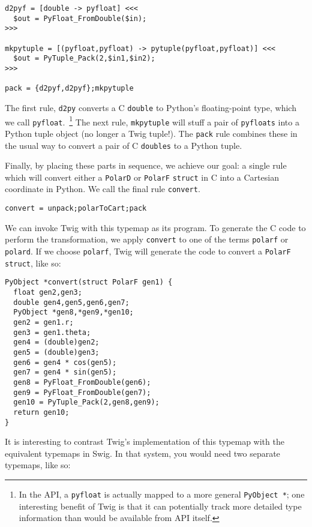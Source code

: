 \begin{verbatim}
d2pyf = [double -> pyfloat] <<<
  $out = PyFloat_FromDouble($in);
>>>

mkpytuple = [(pyfloat,pyfloat) -> pytuple(pyfloat,pyfloat)] <<<
  $out = PyTuple_Pack(2,$in1,$in2);
>>>

pack = {d2pyf,d2pyf};mkpytuple
\end{verbatim}

The first rule, \texttt{d2py} converts a C \texttt{double} to Python's floating-point type, which we call \texttt{pyfloat}.~\footnote{In the API, a \texttt{pyfloat} is actually mapped to a more general \texttt{PyObject *}; one interesting benefit of Twig is that it can potentially track more detailed type information than would be available from API itself.} The next rule, \texttt{mkpytuple} will stuff a pair of \texttt{pyfloats} into a Python tuple object (no longer a Twig tuple!). The \texttt{pack} rule combines these in the usual way to convert a pair of C \texttt{doubles} to a Python tuple.

Finally, by placing these parts in sequence, we achieve our goal: a single rule which will convert either a \texttt{PolarD} or \texttt{PolarF} \texttt{struct} in C into a Cartesian coordinate  in Python. We call the final rule \texttt{convert}.

\begin{verbatim}
convert = unpack;polarToCart;pack
\end{verbatim}

We can invoke Twig with this typemap as its program. To generate the C code to perform the transformation, we apply \texttt{convert} to one of the terms \texttt{polarf} or \texttt{polard}. If we choose \texttt{polarf}, Twig will generate the code to convert a \texttt{PolarF} \texttt{struct}, like so:

\begin{verbatim}
PyObject *convert(struct PolarF gen1) {
  float gen2,gen3;
  double gen4,gen5,gen6,gen7;
  PyObject *gen8,*gen9,*gen10;
  gen2 = gen1.r;
  gen3 = gen1.theta;
  gen4 = (double)gen2;
  gen5 = (double)gen3;
  gen6 = gen4 * cos(gen5);  
  gen7 = gen4 * sin(gen5);
  gen8 = PyFloat_FromDouble(gen6);
  gen9 = PyFloat_FromDouble(gen7);
  gen10 = PyTuple_Pack(2,gen8,gen9);
  return gen10;
}
\end{verbatim}

It is interesting to contrast Twig's implementation of this typemap with the equivalent typemaps in Swig. In that system, you would need two separate typemaps, like so:


